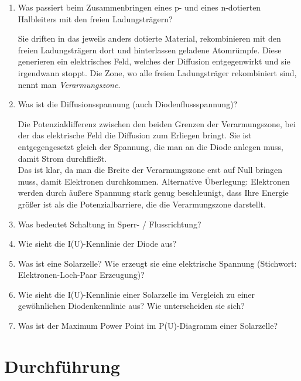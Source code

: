 \begin{tutorhint}
\begin{enumerate}
	\item Was passiert beim Zusammenbringen eines p- und eines n-dotierten Halbleiters mit den freien Ladungsträgern?
	\begin{solution}
		Sie driften in das jeweils anders dotierte Material, rekombinieren mit den freien Ladungsträgern dort und hinterlassen geladene Atomrümpfe. Diese generieren ein elektrisches Feld, welches der Diffusion entgegenwirkt und sie irgendwann stoppt. Die Zone, wo alle freien Ladungsträger rekombiniert sind, nennt man \textit{Verarmungszone}.
	\end{solution}
	\item Was ist die Diffusionsspannung (auch Diodenflussspannung)?
	\begin{solution}
		Die Potenzialdifferenz zwischen den beiden Grenzen der Verarmungszone, bei der das elektrische Feld die Diffusion zum Erliegen bringt. Sie ist entgegengesetzt gleich der Spannung, die man an die Diode anlegen muss, damit Strom durchfließt. \\
		Das ist klar, da man die Breite der Verarmungszone erst auf Null bringen muss, damit Elektronen durchkommen. Alternative Überlegung: Elektronen werden durch äußere Spannung stark genug beschleunigt, dass Ihre Energie größer ist als die Potenzialbarriere, die die Verarmungszone darstellt.
	\end{solution}
	\item Was bedeutet Schaltung in Sperr- / Flussrichtung?
	\item Wie sieht die I(U)-Kennlinie der Diode aus? %
	\item Was ist eine Solarzelle? Wie erzeugt sie eine elektrische Spannung (Stichwort: Elektronen-Loch-Paar Erzeugung)?
	\item Wie sieht die I(U)-Kennlinie einer Solarzelle im Vergleich zu einer gewöhnlichen Diodenkennlinie aus? Wie unterscheiden sie sich?
	\item Was ist der Maximum Power Point im P(U)-Diagramm einer Solarzelle?
\end{enumerate}

\end{tutorhint}
\section{Durchführung} 

